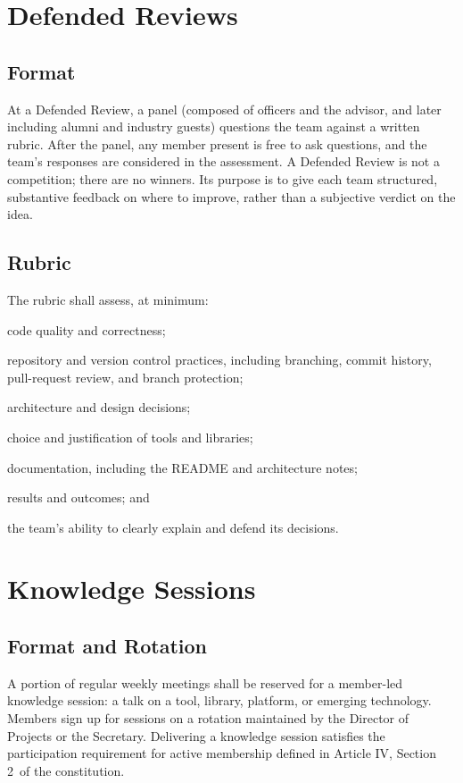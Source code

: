 \documentclass[12pt,letterpaper]{article} %
\newcommand{\constActiveMember}{Article IV, Section 2} %
\begin{document}
\section{Defended Reviews}\label{art:reviews}
\subsection{Format}\label{sec:review-format}
At a Defended Review, a panel (composed of officers and the advisor, and later including alumni
and industry guests) questions the team against a written rubric. After the panel, any member
present is free to ask questions, and the team's responses are considered in the assessment. A
Defended Review is not a competition; there are no winners. Its purpose is to give each team
structured, substantive feedback on where to improve, rather than a subjective verdict on the
idea.
\subsection{Rubric}\label{sec:review-rubric}
The rubric shall assess, at minimum:
\begin{alphalist}
  \item code quality and correctness;
  \item repository and version control practices, including branching, commit history,
  pull-request review, and branch protection;
  \item architecture and design decisions;
  \item choice and justification of tools and libraries;
  \item documentation, including the README and architecture notes;
  \item results and outcomes; and
  \item the team's ability to clearly explain and defend its decisions.
\end{alphalist}

\section{Knowledge Sessions}\label{art:knowledge}
\subsection{Format and Rotation}\label{sec:knowledge-format}
A portion of regular weekly meetings shall be reserved for a member-led knowledge session: a
talk on a tool, library, platform, or emerging technology. Members sign up for sessions on a
rotation maintained by the Director of Projects or the Secretary. Delivering a knowledge
session satisfies the participation requirement for active membership defined in
\constActiveMember\ of the constitution.
\end{document}
